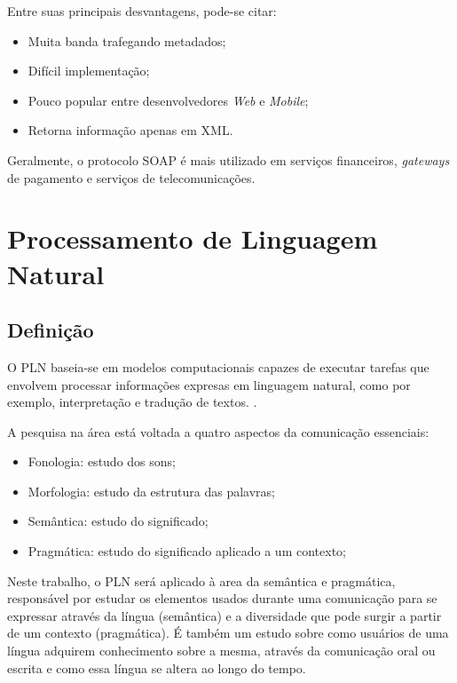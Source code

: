 Entre suas principais desvantagens, pode-se citar:

\begin{itemize}
	\item Muita banda trafegando metadados;
	\item Difícil implementação;
	\item Pouco popular entre desenvolvedores \textit{Web} e \textit{Mobile};
	\item Retorna informação apenas em XML.
\end{itemize}

Geralmente, o protocolo SOAP é mais utilizado em serviços financeiros, \textit{gateways} de pagamento e serviços de telecomunicações.

\section{Processamento de Linguagem Natural}\label{sec:pnl}

\subsection{Definição}

O \ac{PLN} baseia-se em modelos computacionais capazes de executar tarefas que envolvem processar informações expresas em linguagem natural, como por exemplo, interpretação e tradução de textos. \cite{covington1994natural}.

A pesquisa na área está voltada a quatro aspectos da comunicação essenciais:

\begin{itemize}
	\item Fonologia: estudo dos sons;
	\item Morfologia: estudo da estrutura das palavras;
	\item Semântica: estudo do significado;
	\item Pragmática: estudo do significado aplicado a um contexto;
\end{itemize}

Neste trabalho, o PLN será aplicado à area da semântica e pragmática, responsável por estudar os elementos usados durante uma comunicação para se expressar através da língua (semântica) e a diversidade que pode surgir a partir de um contexto (pragmática). É também um estudo sobre como usuários de uma língua adquirem conhecimento sobre a mesma, através da comunicação oral ou escrita e como essa língua se altera ao longo do tempo.

